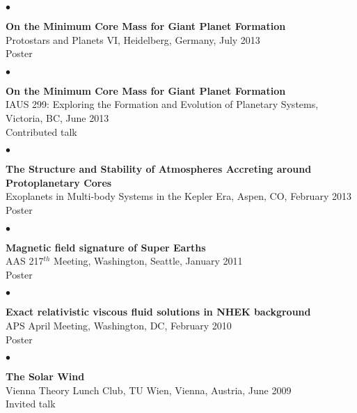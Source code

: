 \documentclass[margin,line]{res}
\newenvironment{list2}{
  \begin{list}{$\bullet$}{%
      \setlength{\itemsep}{0in}
      \setlength{\parsep}{0in} \setlength{\parskip}{0in}
      \setlength{\topsep}{0in} \setlength{\partopsep}{0in} 
      \setlength{\leftmargin}{0.2in}}}{\end{list}}
\begin{document}
\begin{resume}
\begin{list2}
\item[] {\bf On the Minimum Core Mass for Giant Planet Formation} \\
Protostars and Planets VI, Heidelberg, Germany, July 2013  \\
Poster \\
\end{list2}

\begin{list2}
\item[] {\bf On the Minimum Core Mass for Giant Planet Formation} \\
IAUS 299: Exploring the Formation and Evolution of Planetary Systems, Victoria, BC, June 2013  \\
Contributed talk \\
\end{list2}

\begin{list2}
\item[] {\bf The Structure and Stability of Atmospheres Accreting around Protoplanetary Cores} \\
Exoplanets in Multi-body Systems in the Kepler Era, Aspen, CO, February 2013 \\
Poster \\
\end{list2}

\begin{list2}
\item[] {\bf Magnetic field signature of Super Earths} \\
AAS 217$^{th}$ Meeting, Washington, Seattle, January 2011  \\
Poster \\
\end{list2}

\vspace*{-.13in}
\begin{list2}
\item[] {\bf Exact relativistic viscous fluid solutions in NHEK background} \\
APS April Meeting, Washington, DC, February 2010  \\
Poster \\
\end{list2}

\vspace*{-.13in}
\begin{list2}
\item[] {\bf The Solar Wind}\\ 
Vienna Theory Lunch Club, TU Wien, Vienna, Austria, June 2009  \\
Invited talk \\
\end{list2}


\end{resume}
\end{document}
